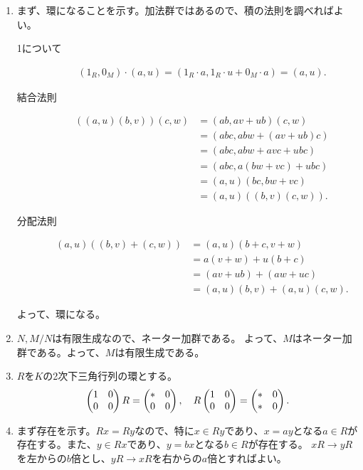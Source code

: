 \documentclass[9pt]{ltjsarticle}
\begin{document}
\begin{enumerate}[label=(問題\arabic*)]
  \item
まず、環になることを示す。加法群ではあるので、積の法則を調べればよい。
\begin{description}
  \item[1について]
  \begin{align}
    (1_R, 0_M)\cdot (a,u)
    =
    (1_R\cdot a, 1_R\cdot u + 0_M \cdot a)
    =
    (a, u).
  \end{align}
  \item[結合法則]
  \begin{align}
    ((a,u)(b,v))(c,w)
    &=
    (ab,av+ub)(c,w)\\
    &=
    (abc,abw+(av+ub)c)\\
    &=
    (abc,abw+avc+ubc)\\
    &=
    (abc,a(bw+vc)+ubc)\\
    &=
    (a,u)(bc,bw+vc)\\
    &=
    (a,u)((b,v)(c,w)).
  \end{align}
  \item[分配法則]
  \begin{align}
    (a,u)((b,v)+(c,w))
    &=
    (a,u)(b+c,v+w)\\
    &=
    a(v+w)+u(b+c)\\
    &=
    (av+ub)+(aw+uc)\\
    &=
    (a,u)(b,v) + (a,u)(c,w).
  \end{align}
\end{description}
よって、環になる。
\item $N,M/N$は有限生成なので、ネーター加群である。
よって、$M$はネーター加群である。よって、$M$は有限生成である。
\item $R$を$K$の2次下三角行列の環とする。
\begin{align}
  \left(\begin{matrix} 1 & 0 \\ 0 & 0 \end{matrix}\right)R = \left(\begin{matrix} * & 0 \\ 0 & 0 \end{matrix}\right),\quad
  R\left(\begin{matrix} 1 & 0 \\ 0 & 0 \end{matrix}\right) = \left(\begin{matrix} * & 0 \\ * & 0 \end{matrix}\right).
\end{align}
\item
まず存在を示す。$Rx=Ry$なので、特に$x\in Ry$であり、$x=ay$となる$a\in R$が存在する。また、$y\in Rx$であり、$y=bx$となる$b\in R$が存在する。
$xR\to yR$を左からの$b$倍とし、$yR \to xR$を右からの$a$倍とすればよい。


\end{enumerate}
\end{document}
